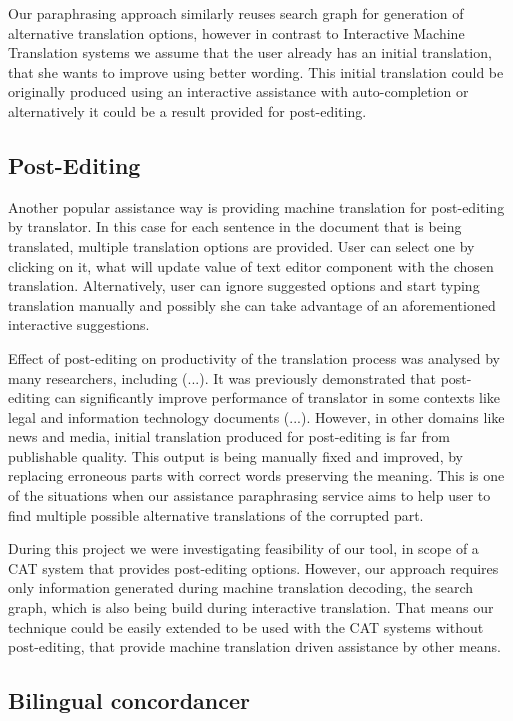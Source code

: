 Our paraphrasing approach similarly reuses search graph for generation of alternative translation options, however in contrast to Interactive Machine Translation systems we assume that the user already has an initial translation, that she wants to improve using better wording. This initial translation could be originally produced using an interactive assistance with auto-completion or alternatively it could be a result provided for post-editing.

\subsection{Post-Editing}

Another popular assistance way is providing machine translation for post-editing by translator. In this case for each sentence in the document that is being translated, multiple translation options are provided. User can select one by clicking on it, what will update value of text editor component with the chosen translation. Alternatively, user can ignore suggested options and start typing translation manually and possibly she can take advantage of an aforementioned interactive suggestions.  

Effect of post-editing on productivity of the translation process was analysed by many researchers, including (...). It was previously demonstrated that post-editing can significantly improve performance of translator in some contexts like legal and information technology documents (...). However, in other domains like news and media, initial translation produced for post-editing is far from publishable quality. This output is being manually fixed and improved, by replacing erroneous parts with correct words preserving the meaning. This is one of the situations when our assistance paraphrasing service aims to help user to find multiple possible alternative translations of the corrupted part.

During this project we were investigating feasibility of our tool, in scope of a CAT system that provides post-editing options. However, our approach requires only information generated during machine translation decoding, the search graph, which is also being build during interactive translation. That means our technique could be easily extended to be used with the CAT systems without post-editing, that provide machine translation driven assistance by other means.

\subsection{Bilingual concordancer}


